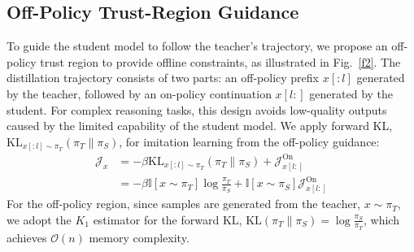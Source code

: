 \documentclass{llmxive}
\providecommand{\arraystretch}{1.12}
\begin{document}
\begin{table}[t!]
\centering
\small
\setlength{\tabcolsep}{10pt}
\renewcommand{\arraystretch}{1.18}
\vskip -0.05in 
\caption{
Region-specific learning objectives and estimators in TrOPD.
Here, $\mathcal{V}_{T}^{(k)}$ denotes the top-$k$ vocabulary under the teacher distribution $\pi_T$.
}
\label{tab:region_objectives}
\vskip -0.1in 
\end{table}


\subsection{Off-Policy Trust-Region Guidance}

To guide the student model to follow the teacher's trajectory, we propose an off-policy trust region to provide offline constraints, as illustrated in Fig.~\ref{f2}.
The distillation trajectory consists of two parts: an off-policy prefix $x[:l]$ generated by the teacher, followed by an on-policy continuation $x[l:]$ generated by the student.
For complex reasoning tasks, this design avoids low-quality outputs caused by the limited capability of the student model.
We apply forward KL, $\mathrm{KL}_{x[:l] \sim \pi_T}(\pi_T \parallel \pi_S)$, for imitation learning from the off-policy guidance:
\begin{equation}
\begin{aligned}
\mathcal{J}_x
&=
-
\beta\mathrm{KL}_{x[:l] \sim \pi_T}(\pi_T \parallel \pi_S)
+
\mathcal{J}^{\mathrm{On}}_{x[l:]} \\
&=
-
\beta \mathbb{I}[x \sim \pi_T]
\log \frac{\pi_T}{\pi_S}
+
\mathbb{I}[x \sim \pi_S]
\mathcal{J}^{\mathrm{On}}_{x[l:]}
\end{aligned}
\end{equation}
For the off-policy region, since samples are generated from the teacher, $x \sim \pi_T$, we adopt the $K_1$ estimator for the forward KL, $\mathrm{KL}(\pi_T \parallel \pi_S) = \log \frac{\pi_S}{\pi_T}$, which achieves $\mathcal{O}(n)$ memory complexity.
\end{document}
